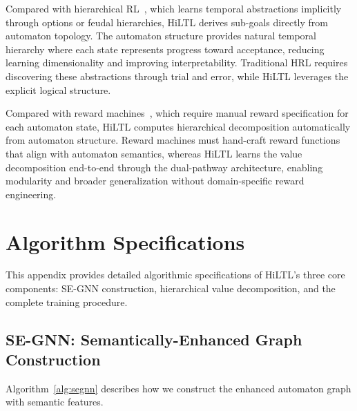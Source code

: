 \documentclass{article}
\begin{document}
Compared with hierarchical RL~\citep{Bacon2017,Nachum2018}, which learns temporal abstractions implicitly through options or feudal hierarchies, HiLTL derives sub-goals directly from automaton topology. The automaton structure provides natural temporal hierarchy where each state represents progress toward acceptance, reducing learning dimensionality and improving interpretability. Traditional HRL requires discovering these abstractions through trial and error, while HiLTL leverages the explicit logical structure.

Compared with reward machines~\citep{Icarte2022}, which require manual reward specification for each automaton state, HiLTL computes hierarchical decomposition automatically from automaton structure. Reward machines must hand-craft reward functions that align with automaton semantics, whereas HiLTL learns the value decomposition end-to-end through the dual-pathway architecture, enabling modularity and broader generalization without domain-specific reward engineering.

\section{Algorithm Specifications}
\label{app:algorithms}

This appendix provides detailed algorithmic specifications of HiLTL's three core components: SE-GNN construction, hierarchical value decomposition, and the complete training procedure.

\subsection{SE-GNN: Semantically-Enhanced Graph Construction}

Algorithm~\ref{alg:segnn} describes how we construct the enhanced automaton graph with semantic features.
\end{document}
